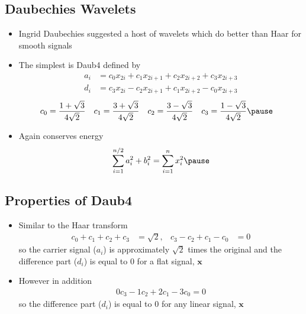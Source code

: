 
\begin{slide}
\section[-2]{Daubechies Wavelets}

\begin{PauseHighLight}
  \begin{itemize}
  \item Ingrid Daubechies suggested a host of wavelets which do better
    than Haar for smooth signals\pause
  \item The simplest is Daub4 defined by
    {\small
      \begin{align*}
        a_i &= c_0 x_{2i} + c_1 x_{2i+1} + c_2 x_{2i+2} + c_3 x_{2i+3} \\
        d_i &= c_3 x_{2i} - c_2 x_{2i+1} + c_1 x_{2i+2} - c_0 x_{2i+3}
      \end{align*}
      \begin{align*}
        c_0 &= \frac{1+\sqrt{3}}{4\sqrt{2}} &
        c_1 &= \frac{3+\sqrt{3}}{4\sqrt{2}} &
        c_2 &= \frac{3-\sqrt{3}}{4\sqrt{2}} &
        c_3 &= \frac{1-\sqrt{3}}{4\sqrt{2}}\pause
      \end{align*}
    }
  \item Again conserves energy
    \begin{align*}
      \sum_{i=1}^{n/2} a_i^2 + b_i^2 = \sum_{i=1}^{n} x_i^2\pause
    \end{align*}
  \end{itemize}
\end{PauseHighLight}

\end{slide}


\begin{slide}
\section{Properties of Daub4}

\begin{PauseHighLight}
  \begin{itemize}
  \item Similar to the Haar transform
    \begin{align*}
      c_0 + c_1 + c_2 + c_3 &= \sqrt{2}, &
      c_3 - c_2 + c_1 - c_0 &= 0
    \end{align*}
    so the carrier signal ($a_i$) is approximately $\sqrt{2}$ times the
    original and the difference part ($d_i$) is equal to 0 for a flat
    signal, $\bm{x}$\pause
  \item However in addition
    \begin{align*}
      0 c_3 - 1 c_2 + 2 c_1 - 3 c_0 = 0
    \end{align*}
    so the difference part ($d_i$) is equal to 0 for any linear signal,
    $\bm{x}$ \pause
  \end{itemize}
\end{PauseHighLight}
\end{slide}

